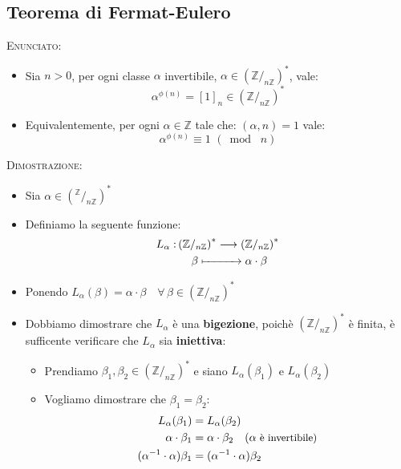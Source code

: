 \documentclass[10pt]{article}
\begin{document}
\subsection{Teorema di Fermat-Eulero}
\textsc{Enunciato:}
\begin{itemize}
\item
Sia $n > 0$, per ogni classe $\alpha$ invertibile, $\alpha \in \left(\mathbb{Z}/_{n \mathbb{Z}}\right)^{*}$, vale:
$$\alpha^{\phi(n)} = \left[1\right]_{n} \in \left(\mathbb{Z}/_{n \mathbb{Z}}\right)^*$$
\item
Equivalentemente, per ogni $\alpha \in \mathbb{Z}$ tale che: $(\alpha,n) = 1$ vale:
$$\alpha^{\phi(n)} \equiv 1 \,\, (\bmod \,\, n)$$
\end{itemize}
\textsc{Dimostrazione:}
\begin{itemize}
\item
Sia $\alpha \in \left(^\mathbb{Z}/_{n \mathbb{Z}}\right)^*$
\item
Definiamo la seguente funzione: 
\begin{equation} 
\begin{split} 
L_\alpha : & \left(\mathbb{Z}/_{n \mathbb{Z}}\right)^{*} \longrightarrow \left(\mathbb{Z}/_{n \mathbb{Z}}\right)^{*} \\
& \quad\,\, \beta \xmapsto{\quad \quad \quad} \alpha \cdot \beta
\notag
\end{split}
\end{equation}
\item
Ponendo $L_\alpha(\beta) = \alpha \cdot \beta \quad \forall \,\beta \in \left(\mathbb{Z}/_{n \mathbb{Z}}\right)^{*}$
\item
Dobbiamo dimostrare che $L_\alpha$ è una \textbf{bigezione}, poichè $\left(\mathbb{Z}/_{n \mathbb{Z}}\right)^{*}$ è finita, è sufficente verificare che $L_\alpha$ sia \textbf{iniettiva}:
\begin{itemize}
\item
Prendiamo $\beta_1, \beta_2 \in \left(\mathbb{Z}/_{n \mathbb{Z}}\right)^{*}$ e siano $L_\alpha(\beta_1)$ e $L_\alpha(\beta_2)$
\item
Vogliamo dimostrare che $\beta_1 = \beta_2$:
\begin{equation} 
\begin{split} 
L_\alpha(\beta_1) &= L_\alpha(\beta_2) \\
\alpha \cdot \beta_1 &= \alpha \cdot \beta_2 \quad \small {( \alpha \textrm{ è invertibile)}}\\
(\alpha^{-1} \cdot \alpha)\beta_1 &= (\alpha^{-1} \cdot \alpha)\beta_2 \\

\end{split}
\end{equation}
\end{itemize}
\end{itemize}
\end{document}
